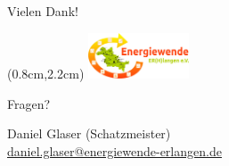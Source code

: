 \begin{frame}{Vielen Dank!}

   \begin{textblock*}{3cm}(0.8cm,2.2cm)  %
      \includegraphics[width=3cm]{images/Logo_EWERH_eV_small.png}
   \end{textblock*}
   \vspace{2.5cm}
   \begin{center}
      \Huge Fragen?
   \end{center}
   \vfill
   \begin{minipage}{0.20\textwidth}
      \centering
   \end{minipage}
   \hfill
   \begin{minipage}{0.75\textwidth}
      \begin{flushright}
         \footnotesize Daniel Glaser (Schatzmeister) \\
         \href{mailto:daniel.glaser@energiewende-erlangen.de}{daniel.glaser@energiewende-erlangen.de}
      \end{flushright}
   \end{minipage}%
\end{frame}

\usebackgroundtemplate{}